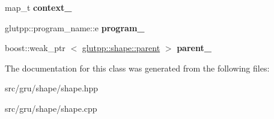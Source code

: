 \begin{DoxyCompactItemize}
\item 
\hypertarget{classglutpp_1_1shape_1_1shape_af98ad3c87922d064515ccca1a19c200c}{map\-\_\-t {\bfseries context\-\_\-}}\label{classglutpp_1_1shape_1_1shape_af98ad3c87922d064515ccca1a19c200c}

\item 
\hypertarget{classglutpp_1_1shape_1_1shape_a539fc204bb3d66edfd27d5b4fa4d6824}{glutpp\-::program\-\_\-name\-::e {\bfseries program\-\_\-}}\label{classglutpp_1_1shape_1_1shape_a539fc204bb3d66edfd27d5b4fa4d6824}

\item 
\hypertarget{classglutpp_1_1shape_1_1shape_abfdfbb519b30adc412d81b80ae86fae2}{boost\-::weak\-\_\-ptr\*
$<$ \hyperlink{classglutpp_1_1shape_1_1parent}{glutpp\-::shape\-::parent} $>$ {\bfseries parent\-\_\-}}\label{classglutpp_1_1shape_1_1shape_abfdfbb519b30adc412d81b80ae86fae2}

\end{DoxyCompactItemize}


\-The documentation for this class was generated from the following files\-:\begin{DoxyCompactItemize}
\item 
src/gru/shape/shape.\-hpp\item 
src/gru/shape/shape.\-cpp\end{DoxyCompactItemize}
